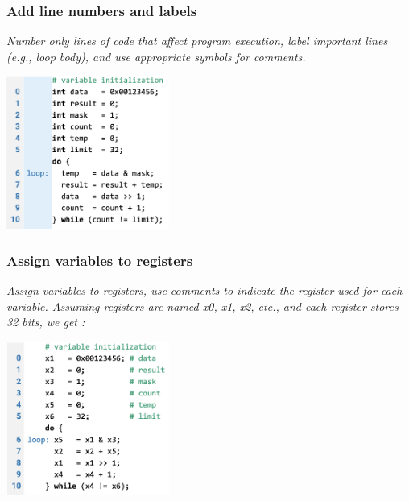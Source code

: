 \documentclass[12pt,openany]{book}
\begin{document}
\subsubsection{Add line numbers and labels}
\textit{Number only lines of code that affect program execution, label important lines (e.g., loop body), and use appropriate symbols for comments.}
\begin{center}
	\includegraphics[width=0.4\textwidth]{circuits/19.3.2.png}
\end{center}
\subsubsection{Assign variables to registers}
\textit{Assign variables to registers, use comments to indicate the register used for each variable. Assuming registers are named x0, x1, x2, etc., and each register stores 32 bits, we get :}

\begin{center}
	\includegraphics[width=0.4\textwidth]{circuits/19.3.2_2.png}
\end{center}
\end{document}

